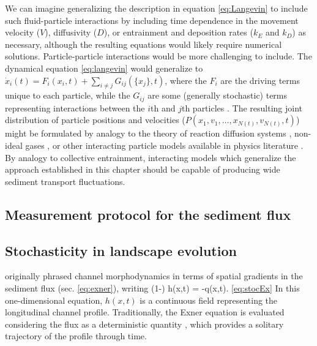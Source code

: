 We can imagine generalizing the description in equation \ref{eq:Langevin} to include such fluid-particle interactions by including time dependence in the movement velocity ($V$), diffusivity ($D$), or entrainment and deposition rates ($k_E$ and $k_D$) as necessary, although the resulting equations would likely require numerical solutions.
Particle-particle interactions would be more challenging to include.
The dynamical equation \ref{eq:langevin} would generalize to $\dot{x}_i(t) = F_i(x_i,t) + \sum_{i\neq j}G_{ij}(\{x_j\},t)$, where the $F_i$ are the driving terms unique to each particle, while the $G_{ij}$ are some (generally stochastic) terms representing interactions between the $i$th and $j$th particles \citep{Goldstein1956}. The resulting joint distribution of particle positions and velocities ($P(x_1,v_1,\dots,x_{N(t)},v_{N(t)},t)$) might be formulated by analogy to the theory of reaction diffusion systems \citep{Cardy2006}, non-ideal gases \citep{Chapman1970,Brilliantov2004}, or other interacting particle models available in physics literature \citep{Hernandez2004,Escaff2018}. 
By analogy to collective entrainment, interacting models which generalize the approach established in this chapter should be capable of producing wide sediment transport fluctuations.

\subsection{Measurement protocol for the sediment flux}




\subsection{Stochasticity in landscape evolution}

\citet{Exner1925} originally phrased channel morphodynamics in terms of spatial gradients in the sediment flux (sec. \ref{eq:exner}), writing
\be (1-\phi) \pt h(x,t) = -\px q(x,t). \ref{eq:stocEx}\ee
In this one-dimensional equation, $h(x,t)$ is a continuous field representing the longitudinal channel profile.
Traditionally, the Exner equation is evaluated considering the flux as a deterministic quantity \citep{Parker2007,Viparelli2011,An2017}, which provides a solitary trajectory of the profile through time.

